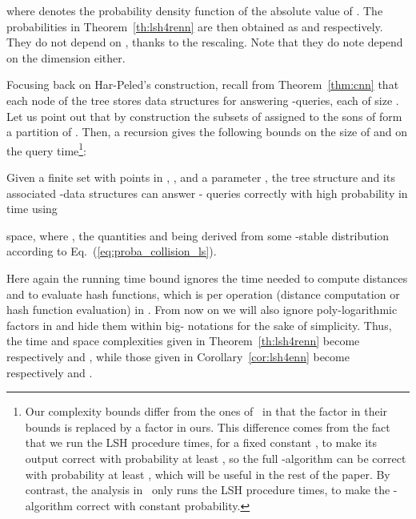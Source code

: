  where  denotes the probability density function of the
 absolute value of . The probabilities  in
 Theorem~\ref{th:lsh4renn} are then obtained as  and 
 respectively. They do not depend on , thanks to the
 rescaling. Note that they do note depend on the dimension 
 either.

Focusing back on Har-Peled's construction, recall from
Theorem~\ref{thm:cnn} that each node  of the tree  stores
 data structures for answering
-\pleb queries, each of size . Let us point out that by construction the subsets of 
assigned to the sons of  form a partition of . Then, a
recursion gives the following bounds on the size of  and on
the query time\footnote{Our complexity bounds differ from
  the ones of~\citet{HarPeledIndykMotwani} in that the 
  factor in their bounds is replaced by a  factor in ours. This
  difference comes from the fact that we run the LSH procedure
   times, for a fixed constant , to make
  its output correct with probability at least ,
  so the full -\nn algorithm can be correct with probability at
  least , which will be useful in the rest of the
  paper. By contrast, the analysis in~\cite{HarPeledIndykMotwani} only
  runs the LSH procedure  times, to make the -\nn
  algorithm correct with constant probability.}:
\begin{cor}\label{cor:lsh4enn}
  Given a finite set  with  points in , , and a parameter , the tree structure  and
  its associated -\pleb data structures can answer -\nn
  queries correctly with high probability in
   time using
  
  space, where , the quantities
   and  being derived from some -stable
  distribution  according to Eq.~(\ref{eq:proba_collision_ls}).
\end{cor}
Here again the running time bound ignores the time needed to compute
distances and to evaluate hash functions, which is  per
operation (distance computation or hash function evaluation) in
. From now on we will also ignore poly-logarithmic factors in
 and hide them within big- notations for the
sake of simplicity. Thus, the time and space complexities given in
Theorem~\ref{th:lsh4renn} become respectively  and , while those given in Corollary~\ref{cor:lsh4enn}
become respectively 
and .

